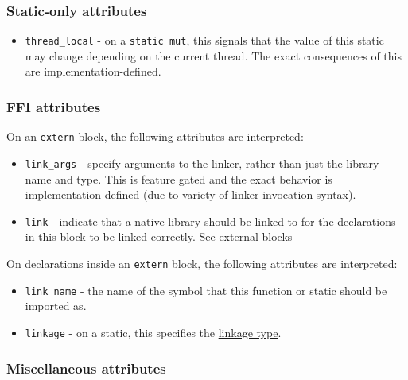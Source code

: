 \documentclass[]{article}
\begin{document}
\subsubsection{Static-only attributes}\label{static-only-attributes}

\begin{itemize}
\itemsep1pt\parskip0pt
\item
  \texttt{thread\_local} - on a \texttt{static mut}, this signals that
  the value of this static may change depending on the current thread.
  The exact consequences of this are implementation-defined.
\end{itemize}

\subsubsection{FFI attributes}\label{ffi-attributes}

On an \texttt{extern} block, the following attributes are interpreted:

\begin{itemize}
\itemsep1pt\parskip0pt
\item
  \texttt{link\_args} - specify arguments to the linker, rather than
  just the library name and type. This is feature gated and the exact
  behavior is implementation-defined (due to variety of linker
  invocation syntax).
\item
  \texttt{link} - indicate that a native library should be linked to for
  the declarations in this block to be linked correctly. See
  \hyperref[external-blocks]{external blocks}
\end{itemize}

On declarations inside an \texttt{extern} block, the following
attributes are interpreted:

\begin{itemize}
\itemsep1pt\parskip0pt
\item
  \texttt{link\_name} - the name of the symbol that this function or
  static should be imported as.
\item
  \texttt{linkage} - on a static, this specifies the
  \href{http://llvm.org/docs/LangRef.html\#linkage-types}{linkage type}.
\end{itemize}

\subsubsection{Miscellaneous attributes}\label{miscellaneous-attributes}
\end{document}
